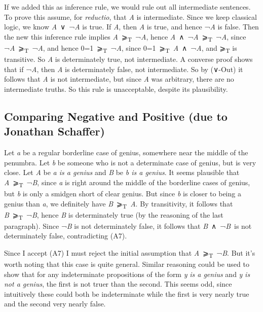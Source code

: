 \documentclass[
  11pt,
  letterpaper,
  DIV=11,
  numbers=noendperiod,
  twoside]{scrartcl}
\begin{document}
If we added this as inference rule, we would rule out all intermediate
sentences. To prove this assume, for \emph{reductio}, that \emph{A} is
intermediate. Since we keep classical logic, we know
\emph{A}~∨~¬\emph{A} is true. If \emph{A}, then \emph{A} is true, and
hence ¬\emph{A} is false. Then the new this inference rule implies
\emph{A}~⩾\textsubscript{T}~¬\emph{A}, hence
\emph{A}~∧~¬\emph{A}~⩾\textsubscript{T}~¬\emph{A}, since
¬\emph{A}~⩾\textsubscript{T}~¬\emph{A}, and hence
0=1~⩾\textsubscript{T}~¬\emph{A}, since
0=1~⩾\textsubscript{T}~\emph{A}~∧~¬\emph{A}, and ⩾\textsubscript{T} is
transitive. So \emph{A} is determinately true, not intermediate. A
converse proof shows that if ¬\emph{A}, then \emph{A} is determinately
false, not intermediate. So by (∨-Out) it follows that \emph{A} is not
intermediate, but since \emph{A} was arbitrary, there are no
intermediate truths. So this rule is unacceptable, despite its
plausibility.

\subsection*{Comparing Negative and Positive (due to Jonathan
Schaffer)}\label{comparing-negative-and-positive-due-to-jonathan-schaffer}

Let \emph{a} be a regular borderline case of genius, somewhere near the
middle of the penumbra. Let \emph{b} be someone who is not a determinate
case of genius, but is very close. Let \emph{A} be \emph{a is a genius}
and \emph{B} be \emph{b is a genius}. It seems plausible that
\emph{A}~⩾\textsubscript{T}~¬\emph{B}, since \emph{a} is right around
the middle of the borderline cases of genius, but \emph{b} is only a
smidgen short of clear genius. But since \emph{b} is closer to being a
genius than \emph{a}, we definitely have
\emph{B}~⩾\textsubscript{T}~\emph{A}. By transitivity, it follows that
\emph{B}~⩾\textsubscript{T}~¬\emph{B}, hence \emph{B} is determinately
true (by the reasoning of the last paragraph). Since ¬\emph{B} is not
determinately false, it follows that \emph{B}~∧~¬\emph{B}~is not
determinately false, contradicting (A7).

Since I accept (A7) I must reject the initial assumption that
\emph{A}~⩾\textsubscript{T}~¬\emph{B}. But it's worth noting that this
case is quite general. Similar reasoning could be used to show that for
any indeterminate propositions of the form \emph{y} \emph{is a genius}
and \emph{y} \emph{is not a genius}, the first is not truer than the
second. This seems odd, since intuitively these could both be
indeterminate while the first is very nearly true and the second very
nearly false.
\end{document}
